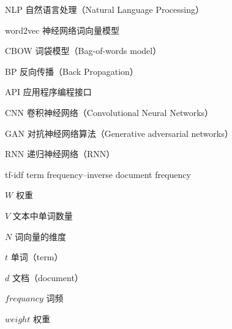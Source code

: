 \begin{denotation}

\item[NLP] 自然语言处理（Natural Language Processing）
\item[word2vec] 神经网络词向量模型
\item[CBOW] 词袋模型（Bag-of-words model）
\item[BP] 反向传播（Back Propagation）
\item[API] 应用程序编程接口
\item[CNN]	卷积神经网络（Convolutional Neural Networks）
\item[GAN]	对抗神经网络算法（Generative adversarial networks）
\item[RNN]	递归神经网络（RNN）
\item[tf-idf]  	term frequency–inverse document frequency
\item [$W$] 权重
\item[$V$] 文本中单词数量
\item[$N$] 词向量的维度
\item[$t$] 单词（term）
\item[$d$] 文档（document）
\item[$frequancy$] 词频
\item[$weight$] 权重
\end{denotation}
